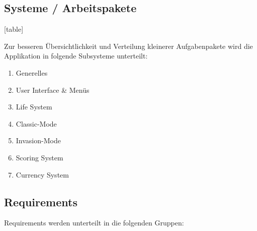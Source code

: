 \subsection{Systeme / Arbeitspakete}



\newcommand{\CAT}{F}
\newcommand{\SYS}{\ref*{sys:ui}}
\newcommand{\setCategory}[1]{ \gdef\CAT{#1} }
\newcommand{\setSystem}[1]{ \gdef\SYS{#1}\hspace*{-9px}\setcounter{rowcntr}{0} }

[table]                             %
\renewcommand{\therowcntr}{\CAT-\SYS-\arabic{rowcntr}}  %


\newcommand{\REQ}[1]{
    \refstepcounter{rowcntr}
    \therowcntr
    \label{#1} 
}




Zur besseren Übersichtlichkeit und Verteilung kleinerer Aufgabenpakete wird die Applikation in folgende
Subsysteme unterteilt:

\begin{enumerate}
    \item \label{sys:gen} Generelles
    \item \label{sys:ui} User Interface \& Menüs
    \item \label{sys:ls} Life System
    \item \label{sys:cm} Classic-Mode
    \item \label{sys:inv} Invasion-Mode
    \item \label{sys:scs} Scoring System
    \item \label{sys:cur} Currency System
\end{enumerate}

\subsection{Requirements}

Requirements werden unterteilt in die folgenden Gruppen:

